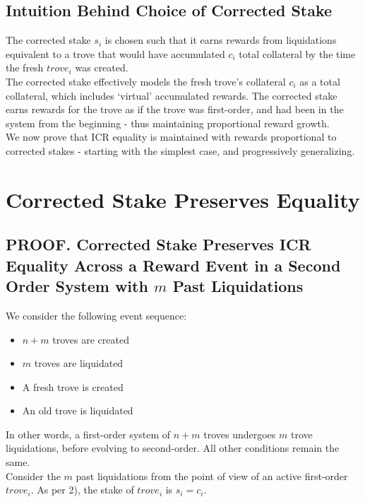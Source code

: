 \documentclass[reqno]{article}
\begin{document}
\subsection{Intuition Behind Choice of Corrected Stake}

The corrected stake $s_i$ is chosen such that it earns rewards from liquidations equivalent to a trove that would have accumulated $c_i$ total collateral by the time the fresh $trove_i$ was created.\\

The corrected stake effectively models the fresh trove’s collateral $c_i$ as a total collateral, which includes ‘virtual’ accumulated rewards. The corrected stake earns rewards for the trove as if the trove was first-order, and had been in the system from the beginning - thus maintaining proportional reward growth.\\

We now prove that ICR equality is maintained with rewards proportional to corrected stakes - starting with the simplest case, and progressively generalizing.

\section{Corrected Stake Preserves Equality}

\subsection{PROOF. Corrected Stake Preserves ICR Equality Across a Reward Event in a Second Order System with $m$ Past Liquidations}

We consider the following event sequence:

\begin{itemize}
  \item $n+m$ troves are created
  \item $m$ troves are liquidated
  \item A fresh trove is created
  \item An old trove is liquidated
\end{itemize}

\bigskip
In other words, a first-order system of $n+m$ troves undergoes $m$ trove liquidations, before evolving to second-order.  All other conditions remain the same.\\

Consider the $m$ past liquidations from the point of view of an active first-order $trove_i$. As per 2), the stake of $trove_i$ is $s_i = c_i$.\\
\end{document}
